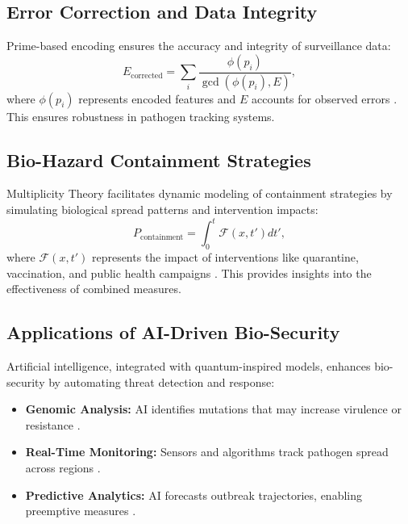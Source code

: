 \documentclass{article}
\theoremstyle{plain}
\begin{document}
\subsection{Error Correction and Data Integrity}
Prime-based encoding ensures the accuracy and integrity of surveillance data:
\begin{equation}
E_{\text{corrected}} = \sum_{i} \frac{\phi(p_i)}{\gcd(\phi(p_i), E)},
\end{equation}
where $\phi(p_i)$ represents encoded features and $E$ accounts for observed errors \cite{primeError2022}. This ensures robustness in pathogen tracking systems.

\subsection{Bio-Hazard Containment Strategies}
Multiplicity Theory facilitates dynamic modeling of containment strategies by simulating biological spread patterns and intervention impacts:
\begin{equation}
P_{\text{containment}} = \int_0^t \mathcal{F}(x, t') dt',
\end{equation}
where $\mathcal{F}(x, t')$ represents the impact of interventions like quarantine, vaccination, and public health campaigns \cite{containmentModel2023}. This provides insights into the effectiveness of combined measures.

\subsection{Applications of AI-Driven Bio-Security}
Artificial intelligence, integrated with quantum-inspired models, enhances bio-security by automating threat detection and response:
\begin{itemize}
    \item \textbf{Genomic Analysis:} AI identifies mutations that may increase virulence or resistance \cite{genomicAI2022}.
    \item \textbf{Real-Time Monitoring:} Sensors and algorithms track pathogen spread across regions \cite{aiMonitoring2023}.
    \item \textbf{Predictive Analytics:} AI forecasts outbreak trajectories, enabling preemptive measures \cite{predictiveAI2023}.
\end{itemize}
\end{document}
